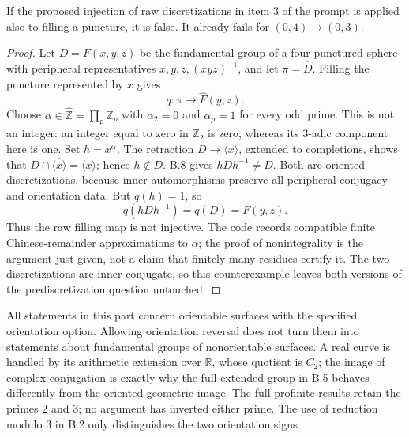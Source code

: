 If the proposed injection of raw discretizations in item 3 of the
prompt is applied also to filling a puncture, it is false.  It
already fails for $(0,4)\to(0,3)$.

\begin{proof}
Let $D=F(x,y,z)$ be the fundamental group of a four-punctured
sphere with peripheral representatives $x,y,z,(xyz)^{-1}$,
and let $\pi=\widehat D$.  Filling the puncture represented by
$x$ gives
\[
 q:\pi\longrightarrow\widehat F(y,z).
\]
Choose $\alpha\in\widehat{\mathbb Z}=\prod_p\mathbb Z_p$ with
$\alpha_2=0$ and $\alpha_p=1$ for every odd prime.  This is not
an integer: an integer equal to zero in $\mathbb Z_2$ is zero,
whereas its $3$-adic component here is one.  Set $h=x^\alpha$.
The retraction $D\to\langle x\rangle$, extended to completions,
shows that
$D\cap\overline{\langle x\rangle}=\langle x\rangle$;
hence $h\notin D$.  B.8 gives $hDh^{-1}\ne D$.
Both are oriented discretizations, because inner automorphisms
preserve all peripheral conjugacy and orientation data.  But
$q(h)=1$, so
\[
 q(hDh^{-1})=q(D)=F(y,z).
\]
Thus the raw filling map is not injective.  The code records
compatible finite Chinese-remainder approximations to $\alpha$;
the proof of nonintegrality is the argument just given, not a
claim that finitely many residues certify it.  The two
discretizations are inner-conjugate, so this counterexample leaves
both versions of the prediscretization question untouched.
\end{proof}

All statements in this part concern orientable surfaces with the
specified orientation option.  Allowing orientation reversal does
not turn them into statements about fundamental groups of
nonorientable surfaces.  A real curve is handled by its arithmetic
extension over $\mathbb R$, whose quotient is $C_2$; the image of
complex conjugation is exactly why the full extended group in
B.5 behaves differently from the oriented geometric image.  The
full profinite results retain the primes $2$ and $3$; no argument
has inverted either prime.  The use of reduction modulo $3$ in
B.2 only distinguishes the two orientation signs.
